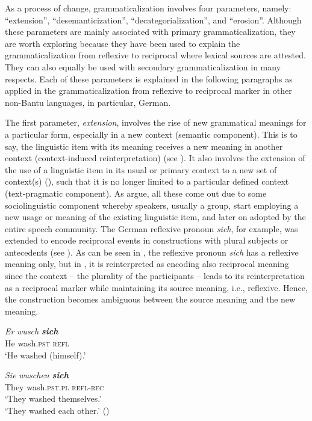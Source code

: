 \documentclass[output=paper,
            colorlinks, citecolor=brown
            ,draftmode
		  ]{langscibook}
\begin{document}
As a process of change, grammaticalization involves four parameters, namely: ``extension'', ``desemanticization'', ``decategorialization'', and ``erosion''. Although these parameters are mainly associated with primary grammaticalization, they are worth exploring because they have been used to explain the grammaticalization from reflexive to reciprocal where lexical sources are attested. They can also equally be used with secondary grammaticalization in many respects. Each of these parameters is explained in the following paragraphs as applied in the grammaticalization from reflexive to reciprocal marker in other non-Bantu languages, in particular, German.

The first parameter, \textit{extension}, involves the rise of new grammatical meanings for a particular form, especially in a new context (semantic component). This is to say, the linguistic item with its meaning receives a new meaning in another context (context-induced reinterpretation) (see \citealt{Heine2002, HeineDunham2010, HeineKuteva2007}). It also involves the extension of the use of a linguistic item in its usual or primary context to a new set of context(s) (\citealt{HeineDunham2010}), such that it is no longer limited to a particular defined context (text\nobreakdash-pragmatic component). As \citet{HeineKuteva2007} argue, all these come out due to some sociolinguistic component whereby speakers, usually a group, start employing a new usage or meaning of the existing linguistic item, and later on adopted by the entire speech community. The German reflexive pronoun \textit{sich}, for example, was extended to encode reciprocal events in constructions with plural subjects or antecedents (see \citealt{HeineMiyashita2008, HeineNarrog2009}). As can be seen in , the reflexive pronoun \textit{sich} has a reflexive meaning only, but in , it is reinterpreted as encoding also reciprocal meaning since the context -- the plurality of the participants -- leads to its reinterpretation as a reciprocal marker while maintaining its source meaning, i.e., reflexive. Hence, the construction becomes ambiguous between the source meaning and the new meaning.

\ea\label{ex:ngwasi:19}
\gll \textit{Er}   \textit{wusch} \textbf{\textit{sich}}\\
He   wash.\textsc{pst}  \textsc{refl}\\
\glt ‘He washed (himself).’


\ex\label{ex:ngwasi:20}
\gll \textit{Sie}   \textit{wuschen} \textbf{\textit{sich}}\\
They  wash.\textsc{pst.pl}  \textsc{refl-rec}\\
\glt ‘They washed themselves.’ \\ 
‘They washed each other.’        (\citealt[410]{HeineNarrog2009}) 
\z
\end{document}
